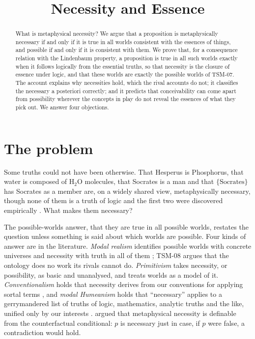 \documentclass{situationist-preprint}
\title{Necessity and Essence}
\begin{document}
\maketitle

\begin{abstract}
What is metaphysical necessity? We argue that a proposition is metaphysically necessary if and only if it is true in all worlds consistent with the essences of things, and possible if and only if it is consistent with them. We prove that, for a consequence relation with the Lindenbaum property, a proposition is true in all such worlds exactly when it follows logically from the essential truths, so that necessity is the closure of essence under logic, and that these worlds are exactly the possible worlds of TSM-07. The account explains why necessities hold, which the rival accounts do not; it classifies the necessary a posteriori correctly; and it predicts that conceivability can come apart from possibility wherever the concepts in play do not reveal the essences of what they pick out. We answer four objections.
\end{abstract}

\section{The problem}

Some truths could not have been otherwise. That Hesperus is Phosphorus, that water is composed of H$_2$O molecules, that Socrates is a man and that $\{\text{Socrates}\}$ has Socrates as a member are, on a widely shared view, metaphysically necessary, though none of them is a truth of logic and the first two were discovered empirically \citep{Kripke1980}. What makes them necessary?

The possible-worlds answer, that they are true in all possible worlds, restates the question unless something is said about which worlds are possible. Four kinds of answer are in the literature. \emph{Modal realism} identifies possible worlds with concrete universes and necessity with truth in all of them \citep{Lewis1986}; TSM-08 argues that the ontology does no work its rivals cannot do. \emph{Primitivism} takes necessity, or possibility, as basic and unanalysed, and treats worlds as a model of it. \emph{Conventionalism} holds that necessity derives from our conventions for applying sortal terms \citep{Sidelle1989}, and \emph{modal Humeanism} holds that \enquote{necessary} applies to a gerrymandered list of truths of logic, mathematics, analytic truths and the like, unified only by our interests \citep{Sider2011}. \citet{Williamson2007} argued that metaphysical necessity is definable from the counterfactual conditional: $p$ is necessary just in case, if $p$ were false, a contradiction would hold.
\end{document}
